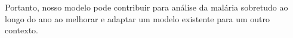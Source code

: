 \documentclass[
	12pt,				%
	openright,			%
	twoside,			%
	a4paper,			%
	english,			%
	french,				%
	spanish,			%
	brazil				%
	]{abntex2}
\begin{document}
 Portanto, nosso modelo pode contribuir para análise da malária sobretudo ao longo do ano ao melhorar e adaptar um modelo existente para um outro contexto. 






\end{document}
